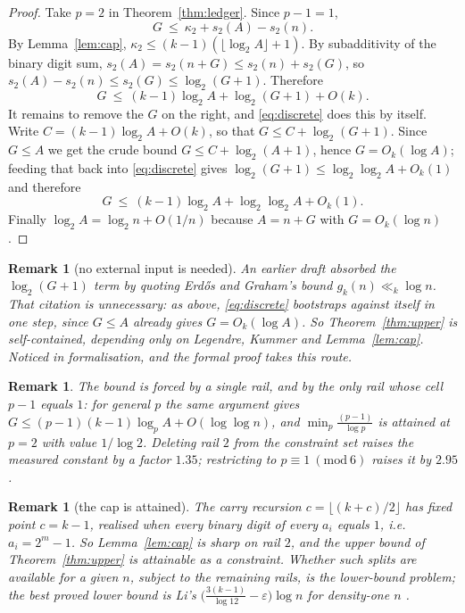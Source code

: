 \documentclass[11pt]{article}
\newtheorem{remark}[theorem]{Remark}
\begin{document}
\begin{proof}
Take $p=2$ in Theorem~\ref{thm:ledger}.  Since $p-1=1$,
\[
  G\ \le\ \kappa_2+s_2(A)-s_2(n).
\]
By Lemma~\ref{lem:cap}, $\kappa_2\le(k-1)(\lfloor\log_2A\rfloor+1)$.  By subadditivity of
the binary digit sum, $s_2(A)=s_2(n+G)\le s_2(n)+s_2(G)$, so
$s_2(A)-s_2(n)\le s_2(G)\le\log_2(G+1)$.  Therefore
\begin{equation}\label{eq:discrete}
  G\ \le\ (k-1)\log_2A+\log_2(G+1)+O(k).
\end{equation}
It remains to remove the $G$ on the right, and \eqref{eq:discrete} does this by itself.
Write $C=(k-1)\log_2A+O(k)$, so that $G\le C+\log_2(G+1)$.  Since $G\le A$ we get the crude
bound $G\le C+\log_2(A+1)$, hence $G=O_k(\log A)$; feeding that back into
\eqref{eq:discrete} gives $\log_2(G+1)\le\log_2\log_2A+O_k(1)$ and therefore
\[
  G\ \le\ (k-1)\log_2A+\log_2\log_2A+O_k(1).
\]
Finally $\log_2A=\log_2n+O(1/n)$ because $A=n+G$ with $G=O_k(\log n)$.
\end{proof}

\begin{remark}[no external input is needed]\label{rem:selfcontained}
An earlier draft absorbed the $\log_2(G+1)$ term by quoting Erd\H{o}s and Graham's bound
$g_k(n)\ll_k\log n$.  That citation is unnecessary: as above, \eqref{eq:discrete} bootstraps
against itself in one step, since $G\le A$ already gives $G=O_k(\log A)$.  So
Theorem~\ref{thm:upper} is self-contained, depending only on Legendre, Kummer and
Lemma~\ref{lem:cap}.  Noticed in formalisation, and the formal proof takes this route.
\end{remark}

\begin{remark}
The bound is forced by a single rail, and by the \emph{only} rail whose cell $p-1$ equals
$1$: for general $p$ the same argument gives
$G\le(p-1)(k-1)\log_pA+O(\log\log n)$, and $\min_p\frac{(p-1)}{\log p}$ is attained at
$p=2$ with value $1/\log2$.  Deleting rail $2$ from the constraint set raises the measured
constant by a factor $1.35$; restricting to $p\equiv1\ (\mathrm{mod}\ 6)$ raises it by
$2.95$.
\end{remark}

\begin{remark}[the cap is attained]
The carry recursion $c=\lfloor(k+c)/2\rfloor$ has fixed point $c=k-1$, realised when every
binary digit of every $a_i$ equals $1$, i.e.\ $a_i=2^{m}-1$.  So Lemma~\ref{lem:cap} is
sharp on rail $2$, and the upper bound of Theorem~\ref{thm:upper} is attainable
\emph{as a constraint}.  Whether such splits are available for a given $n$, subject to the
remaining rails, is the lower-bound problem; the best proved lower bound is Li's
$\bigl(\frac{3(k-1)}{\log12}-\varepsilon\bigr)\log n$ for density-one $n$ \cite{Li400}.
\end{remark}
\end{document}
